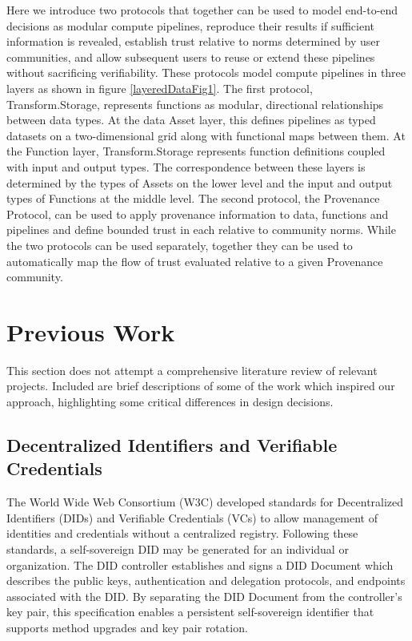 \documentclass[9pt, oneside]{article}   	%
\begin{document}
Here we introduce two protocols that together can be used to model end-to-end decisions as modular compute pipelines, reproduce their results if sufficient information is revealed, establish trust relative to norms determined by user communities, and allow subsequent users to reuse or extend these pipelines without sacrificing verifiability. These protocols model compute pipelines in three layers as shown in figure \ref{layeredDataFig1}. The first protocol, Transform.Storage, represents functions as modular, directional relationships between data types. At the data Asset layer, this defines pipelines as typed datasets on a two-dimensional grid along with functional maps between them. At the Function layer, Transform.Storage represents function definitions coupled with input and output types. The correspondence between these layers is determined by the types of Assets on the lower level and the input and output types of Functions at the middle level. The second protocol, the Provenance Protocol, can be used to apply provenance information to data, functions and pipelines and define bounded trust in each relative to community norms. While the two protocols can be used separately, together they can be used to automatically map the flow of trust evaluated relative to a given Provenance community.

\section{Previous Work}\label{PrevWork}

This section does not attempt a comprehensive literature review of relevant projects. Included are brief descriptions of some of the work which inspired our approach, highlighting some critical differences in design decisions.

\subsection{Decentralized Identifiers and Verifiable Credentials}\label{did-vc}

The World Wide Web Consortium (W3C) developed standards for Decentralized Identifiers (DIDs) and Verifiable Credentials (VCs) to allow management of identities and credentials without a centralized registry. Following these standards, a self-sovereign DID may be generated for an individual or organization. The DID controller establishes and signs a DID Document which describes the public keys, authentication and delegation protocols, and endpoints associated with the DID. By separating the DID Document from the controller's key pair, this specification enables a persistent self-sovereign identifier that supports method upgrades and key pair rotation. \cite{w3cDID}
\end{document}
